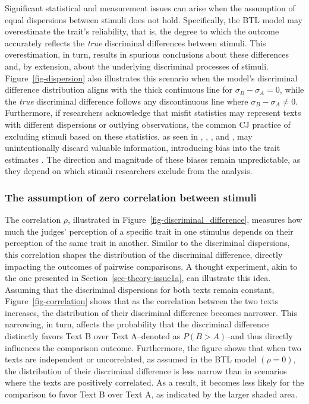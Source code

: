 \documentclass[
  authoryear,
  review,
  1p]{elsarticle}
\begin{document}
Significant statistical and measurement issues can arise when the
assumption of equal dispersions between stimuli does not hold.
Specifically, the BTL model may overestimate the trait's reliability,
that is, the degree to which the outcome accurately reflects the
\emph{true} discriminal differences between stimuli. This
overestimation, in turn, results in spurious conclusions about these
differences \citep{McElreath_2020, Wu_et_al_2022} and, by extension,
about the underlying discriminal processes of stimuli.
Figure~\ref{fig-dispersion} also illustrates this scenario when the
model's discriminal difference distribution aligns with the thick
continuous line for \(\sigma_{B}-\sigma_{A}=0\), while the \emph{true}
discriminal difference follows any discontinuous line where
\(\sigma_{B}-\sigma_{A} \neq 0\). Furthermore, if researchers
acknowledge that misfit statistics may represent texts with different
dispersions or outlying observations, the common CJ practice of
excluding stimuli based on these statistics, as seen in
\citet{Pollitt_2012a}, \citet{Pollitt_2012b},
\citet{vanDaal_et_al_2016}, and \citet{Goossens_et_al_2018}, may
unintentionally discard valuable information, introducing bias into the
trait estimates \citep{Zimmerman_1994, McElreath_2020}. The direction
and magnitude of these biases remain unpredictable, as they depend on
which stimuli researchers exclude from the analysis.

\subsubsection{The assumption of zero correlation between
stimuli}\label{sec-theory-issue1b}

The correlation \(\rho\), illustrated in
Figure~\ref{fig-discriminal_difference}, measures how much the judges'
perception of a specific trait in one stimulus depends on their
perception of the same trait in another. Similar to the discriminal
dispersions, this correlation shapes the distribution of the discriminal
difference, directly impacting the outcomes of pairwise comparisons. A
thought experiment, akin to the one presented in
Section~\ref{sec-theory-issue1a}, can illustrate this idea. Assuming
that the discriminal dispersions for both texts remain constant,
Figure~\ref{fig-correlation} shows that as the correlation between the
two texts increases, the distribution of their discriminal difference
becomes narrower. This narrowing, in turn, affects the probability that
the discriminal difference distinctly favors Text B over Text A--denoted
as \(P(B > A)\)--and thus directly influences the comparison outcome.
Furthermore, the figure shows that when two texts are independent or
uncorrelated, as assumed in the BTL model \((\rho=0)\), the distribution
of their discriminal difference is less narrow than in scenarios where
the texts are positively correlated. As a result, it becomes less likely
for the comparison to favor Text B over Text A, as indicated by the
larger shaded area.
\end{document}
